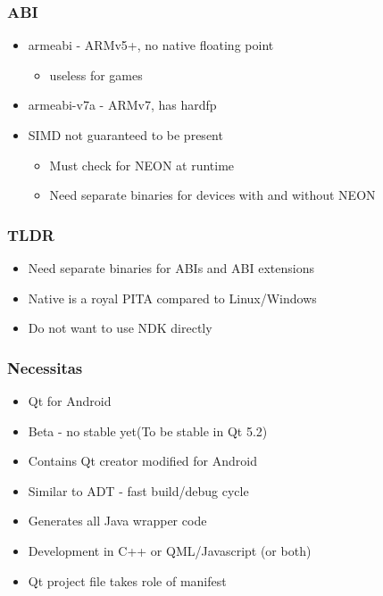 \documentclass[ignorenonframetext]{beamer}
\begin{document}
\begin{frame}[fragile]
\frametitle{ABI}

\begin{itemize}

\item armeabi - ARMv5+, no native floating point
\begin{itemize}

\item useless for games
\end{itemize}

\item armeabi-v7a - ARMv7, has hardfp

\item SIMD not guaranteed to be present
\begin{itemize}

\item Must check for NEON at runtime

\item Need separate binaries for devices with and without NEON
\end{itemize}
\end{itemize}
\end{frame}

\begin{frame}[fragile]
\frametitle{TLDR}

\begin{itemize}

\item Need separate binaries for ABIs and ABI extensions

\item Native is a royal PITA compared to Linux/Windows

\item Do not want to use NDK directly
\end{itemize}
\end{frame}

\begin{frame}[fragile]
\frametitle{Necessitas}

\begin{itemize}

\item Qt for Android

\item Beta - no stable yet(To be stable in Qt 5.2)

\item Contains Qt creator modified for Android

\item Similar to ADT - fast build/debug cycle

\item Generates all Java wrapper code

\item Development in C++ or QML/Javascript (or both)

\item Qt project file takes role of manifest
\end{itemize}
\end{frame}
\end{document}
